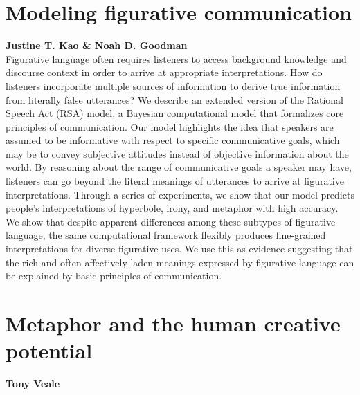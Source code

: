 \documentclass[10pt,letterpaper]{article}
\begin{document}
\section{Modeling figurative communication}
\large \textbf{Justine T. Kao \& Noah D. Goodman}\\
Figurative language often requires listeners to access background knowledge and discourse context in order to arrive at appropriate interpretations. 
How do listeners incorporate multiple sources of information to derive true information from literally false utterances? We describe an extended version of the Rational Speech Act (RSA) model, a Bayesian computational model that formalizes core principles of communication. Our model highlights the idea that speakers are assumed to be informative with respect to specific communicative goals, which may be to convey subjective attitudes instead of objective information about the world. By reasoning about the range of communicative goals a speaker may have, listeners can go beyond the literal meanings of utterances to arrive at figurative interpretations. Through a series of experiments, we show that our model predicts people's interpretations of hyperbole, irony, and metaphor with high accuracy. We show that despite apparent differences among these subtypes of figurative language, the same computational framework flexibly produces fine-grained interpretations for diverse figurative uses. We use this as evidence suggesting that the rich and often affectively-laden meanings expressed by figurative language can be explained by basic principles of communication.


\section{Metaphor and the human creative potential}
\large \textbf{Tony Veale}
\end{document}
